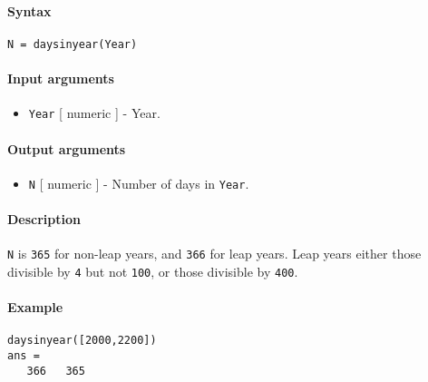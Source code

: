 


	\paragraph{Syntax}

\begin{verbatim}
N = daysinyear(Year)
\end{verbatim}

\paragraph{Input arguments}

\begin{itemize}
\itemsep1pt\parskip0pt
\item
  \texttt{Year} {[} numeric {]} - Year.
\end{itemize}

\paragraph{Output arguments}

\begin{itemize}
\itemsep1pt\parskip0pt
\item
  \texttt{N} {[} numeric {]} - Number of days in \texttt{Year}.
\end{itemize}

\paragraph{Description}

\texttt{N} is \texttt{365} for non-leap years, and \texttt{366} for leap
years. Leap years either those divisible by \texttt{4} but not
\texttt{100}, or those divisible by \texttt{400}.

\paragraph{Example}

\begin{verbatim}
daysinyear([2000,2200])
ans =
   366   365
\end{verbatim}


